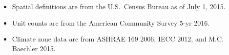 \begin{itemize}
\item Spatial definitions are from the U.S.~Census Bureau as of July 1, 2015.
\item Unit counts are from the American Community Survey 5-yr 2016.
\item Climate zone data are from ASHRAE 169 2006, IECC 2012, and M.C. Baechler 2015.
\end{itemize}
